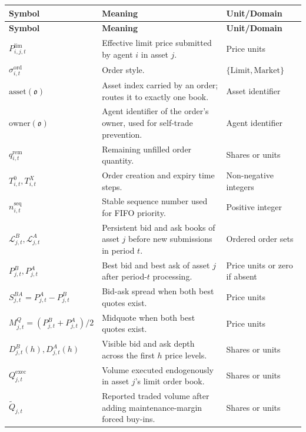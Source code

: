 \documentclass[12pt, a4paper]{article}
\begin{document}
    \begin{longtable}{@{}L{0.22\textwidth}L{0.50\textwidth}L{0.20\textwidth}@{}}
        \toprule
        \textbf{Symbol} & \textbf{Meaning} & \textbf{Unit/Domain} \\
        \midrule
        \endfirsthead
        \toprule
        \textbf{Symbol} & \textbf{Meaning} & \textbf{Unit/Domain} \\
        \midrule
        \endhead
        \(P_{i,j,t}^{\text{lim}}\) & Effective limit price submitted by agent \(i\) in asset \(j\). & Price units \\
        \(\sigma_{i,t}^{\text{ord}}\) & Order style. & \(\{\mathrm{Limit},\mathrm{Market}\}\) \\
        \(\mathrm{asset}(\mathfrak{o})\) & Asset index carried by an order; routes it to exactly one book. & Asset identifier \\
        \(\mathrm{owner}(\mathfrak{o})\) & Agent identifier of the order's owner, used for self-trade prevention. & Agent identifier \\
        \(q_{i,t}^{\text{rem}}\) & Remaining unfilled order quantity. & Shares or units \\
        \(T_{i,t}^{0},T_{i,t}^{X}\) & Order creation and expiry time steps. & Non-negative integers \\
        \(n_{i,t}^{\text{seq}}\) & Stable sequence number used for FIFO priority. & Positive integer \\
        \(\mathcal{L}_{j,t}^B,\mathcal{L}_{j,t}^A\) & Persistent bid and ask books of asset \(j\) before new submissions in period \(t\). & Ordered order sets \\
        \(P_{j,t}^B,P_{j,t}^A\) & Best bid and best ask of asset \(j\) after period-\(t\) processing. & Price units or zero if absent \\
        \(S_{j,t}^{BA}=P_{j,t}^A-P_{j,t}^B\) & Bid-ask spread when both best quotes exist. & Price units \\
        \(M_{j,t}^{Q}=(P_{j,t}^B+P_{j,t}^A)/2\) & Midquote when both best quotes exist. & Price units \\
        \(D_{j,t}^B(h),D_{j,t}^A(h)\) & Visible bid and ask depth across the first \(h\) price levels. & Shares or units \\
        \(Q_{j,t}^{\text{exec}}\) & Volume executed endogenously in asset \(j\)'s limit order book. & Shares or units \\
        \(\widetilde Q_{j,t}\) & Reported traded volume after adding maintenance-margin forced buy-ins. & Shares or units \\

\end{longtable}
\end{document}

